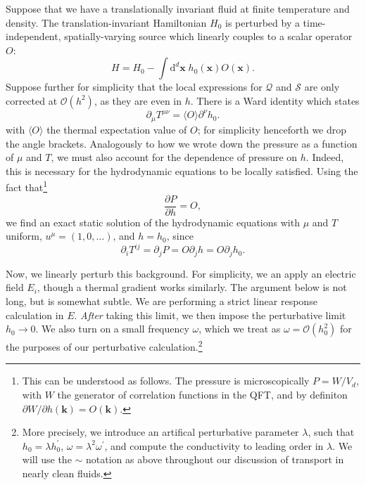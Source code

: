 \documentclass[10pt, oneside]{book}
\begin{document}
\begin{doublespace}
Suppose that we have a translationally invariant fluid at finite temperature and density.   The translation-invariant Hamiltonian $H_0$ is perturbed by a time-independent, spatially-varying source which linearly couples to a scalar operator $O$: \begin{equation}
H = H_0 - \int \mathrm{d}^d\mathbf{x} \; h_0(\mathbf{x}) O(\mathbf{x}).   \label{eq:Hbroken}
\end{equation}
Suppose further for simplicity that the local expressions for $\mathcal{Q}$ and $\mathcal{S}$ are only corrected at $\mathcal{O}(h^2)$, as they are even in $h$.      There is a Ward identity which states \begin{equation}
\partial_\mu T^{\mu \nu} = \langle O\rangle \partial^\nu h_0.   \label{eq:scalarward}
\end{equation}with $\langle O\rangle$ the thermal expectation value of $O$; for simplicity henceforth we drop the angle brackets.  Analogously to how we wrote down the pressure as a function of $\mu$ and $T$, we must also account for the dependence of pressure on $h$.  Indeed, this is necessary for the hydrodynamic equations to be locally satisfied.   Using the fact that\footnote{This can be understood as follows.   The pressure is microscopically $P=W/V_d$, with $W$ the generator of correlation functions in the QFT, and by definiton $\partial W/\partial h(\mathbf{k}) = O(\mathbf{k})$. \par }
\begin{equation}
\frac{\partial P}{\partial h} = O,
\end{equation}
we find an exact static solution of the hydrodynamic equations with $\mu$ and $T$ uniform, $u^\mu=(1,0,\ldots)$, and $h=h_0$, since \begin{equation}
\partial_i T^{ij} = \partial_j P = O \partial_j h = O\partial_j h_0.
\end{equation}

Now, we linearly perturb  this background.   For simplicity, we an apply an electric field $E_i$, though a thermal gradient works similarly.   The argument below is not long, but is somewhat subtle.   We are performing a strict linear response calculation in $E$.   \emph{After} taking this limit, we then impose the perturbative limit $h_0\rightarrow 0$.   We also turn on a small frequency $\omega$, which we treat as $\omega=\mathcal{O}(h_0^2)$ for the purposes of our perturbative calculation.\footnote{More precisely, we introduce an artifical perturbative parameter $\lambda$,  such that $h_0 = \lambda h_0^\prime$,  $\omega = \lambda^2 \omega^\prime$,  and compute the conductivity to leading order in $\lambda$.   We will use the $\sim$ notation as above throughout our discussion of transport in nearly clean fluids.}


\end{doublespace}
\end{document}
